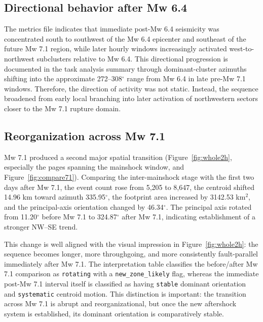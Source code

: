 \documentclass[11pt]{article}
\begin{document}
\subsection{Directional behavior after Mw 6.4}
The metrics file indicates that immediate post-Mw 6.4 seismicity was concentrated south to southwest of the Mw 6.4 epicenter and southeast of the future Mw 7.1 region, while later hourly windows increasingly activated west-to-northwest subclusters relative to Mw 6.4. This directional progression is documented in the task analysis summary through dominant-cluster azimuths shifting into the approximate 272--308$^{\circ}$ range from Mw 6.4 in late pre-Mw 7.1 windows. Therefore, the direction of activity was not static. Instead, the sequence broadened from early local branching into later activation of northwestern sectors closer to the Mw 7.1 rupture domain.

\subsection{Reorganization across Mw 7.1}
Mw 7.1 produced a second major spatial transition (Figure~\ref{fig:whole2h}, especially the pages spanning the mainshock window, and Figure~\ref{fig:compare71}). Comparing the inter-mainshock stage with the first two days after Mw 7.1, the event count rose from 5{,}205 to 8{,}647, the centroid shifted 14.96 km toward azimuth 335.95$^{\circ}$, the footprint area increased by 3142.53 km$^2$, and the principal-axis orientation changed by 46.34$^{\circ}$. The principal axis rotated from 11.20$^{\circ}$ before Mw 7.1 to 324.87$^{\circ}$ after Mw 7.1, indicating establishment of a stronger NW--SE trend.

This change is well aligned with the visual impression in Figure~\ref{fig:whole2h}: the sequence becomes longer, more throughgoing, and more consistently fault-parallel immediately after Mw 7.1. The interpretation table classifies the before/after Mw 7.1 comparison as \texttt{rotating} with a \texttt{new\_zone\_likely} flag, whereas the immediate post-Mw 7.1 interval itself is classified as having \texttt{stable} dominant orientation and \texttt{systematic} centroid motion. This distinction is important: the transition across Mw 7.1 is abrupt and reorganizational, but once the new aftershock system is established, its dominant orientation is comparatively stable.
\end{document}
